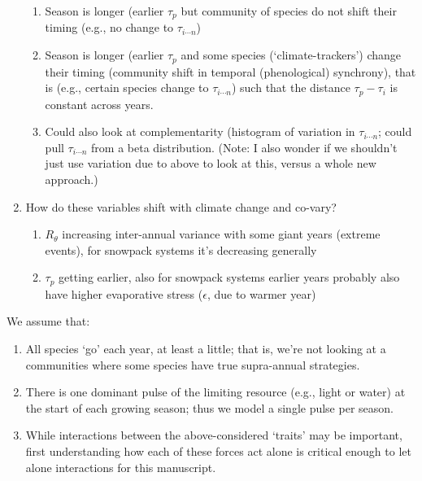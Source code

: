 \documentclass[11pt,a4paper,oneside]{article}
\begin{document}
\begin{enumerate}
\begin{enumerate}
\item Season is longer (earlier \(\tau_{p}\) but community of species
  do not shift their timing (e.g., no change to  \(\tau_{i \cdots
    n}\)) 
\item Season is longer (earlier \(\tau_{p}\) and some species (`climate-trackers') change
  their timing (community shift in temporal (phenological) synchrony),
  that is (e.g., certain species change to  \(\tau_{i \cdots
    n}\)) such that the distance \(\tau_{p}-\tau_{i}\) is constant
  across years.
\item Could also look at complementarity (histogram of variation in \(\tau_{i \cdots
    n}\); could pull \(\tau_{i \cdots
    n}\) from a beta distribution. (Note: I also wonder if we
  shouldn't just use variation due to above to look at this, versus a
  whole new approach.)
\end{enumerate}
\item How do these variables shift with climate change and co-vary?
\begin{enumerate} 
\item \(R_{\theta}\) increasing inter-annual variance with some giant
  years (extreme events), for snowpack systems it's decreasing
  generally
\item \(\tau_{p}\) getting earlier, also for snowpack systems earlier
  years probably also have higher evaporative stress (\(\epsilon\),
  due to warmer year)
\end{enumerate}
\end{enumerate}

\noindent We assume that:
\begin{enumerate}
\item All species `go' each year, at least a little; that is, we're
  not looking at a communities where some species have true
  supra-annual strategies.
\item There is one dominant pulse of the limiting resource (e.g.,
  light or water) at the
  start of each growing season; thus we model a  single pulse per
  season.
\item While interactions between the above-considered `traits' may be
  important, first understanding how each of these forces act alone is
  critical enough to let alone interactions for this manuscript.
\end{enumerate}
\end{document}
